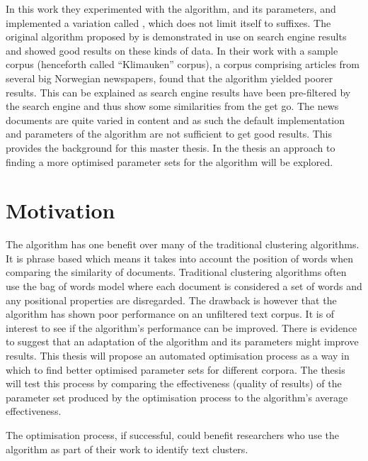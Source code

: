 In this work they experimented with the \STC algorithm, and its parameters, and implemented a variation called \CTC, which does not limit itself to suffixes. The original \STC algorithm proposed by \textcite{Oren1998} is demonstrated in use on search engine results and showed good results on these kinds of data. In their work with a sample corpus (henceforth called ``Klimauken'' corpus), a corpus comprising articles from several big Norwegian newspapers, \cite{Moe2014compact} found that the \STC algorithm yielded poorer results. This can be explained as search engine results have been pre-filtered by the search engine and thus show some similarities from the get go. The news documents are quite varied in content and as such the default implementation and parameters of the \STC algorithm are not sufficient to get good results. This provides the background for this master thesis. In the thesis an approach to finding a more optimised parameter sets for the \CTC algorithm will be explored.


\section{Motivation}

The \STC algorithm has one benefit over many of the traditional clustering algorithms. It is phrase based which means it takes into account the position of words when comparing the similarity of documents. Traditional clustering algorithms often use the bag of words model where each document is considered a set of words and any positional properties are disregarded. The drawback is however that the \STC algorithm has shown poor performance on an unfiltered text corpus. It is of interest to see if the algorithm's performance can be improved. There is evidence to suggest that an adaptation of the algorithm and its parameters might improve results. This thesis will propose an automated optimisation process as a way in which to find better optimised parameter sets for different corpora. The thesis will test this process by comparing the effectiveness (quality of results) of the parameter set produced by the optimisation process to the algorithm's average effectiveness.

The optimisation process, if successful, could benefit researchers who use the algorithm as part of their work to identify text clusters.

